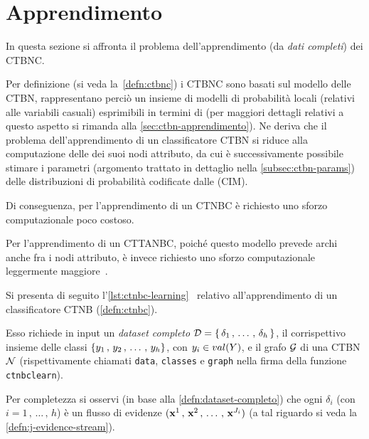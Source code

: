 \section{Apprendimento}\label{sec:learning-ctbnc}
In questa sezione si affronta il problema dell'apprendimento (da \emph{dati completi}) dei \acs{CTBNC}.

Per definizione (si veda la~\vref{defn:ctbnc}) i \acs{CTBNC} sono basati sul modello delle \acs{CTBN}, rappresentano perciò un insieme di modelli di probabilità locali (relativi alle variabili casuali) esprimibili in termini di \stats{} (per maggiori dettagli relativi a questo aspetto si rimanda alla \autoref{sec:ctbn-apprendimento}). Ne deriva che il problema dell'apprendimento di un classificatore \acs{CTBN} si riduce alla computazione delle \stats{} dei suoi nodi attributo, da cui è successivamente possibile stimare i parametri (argomento trattato in dettaglio nella \autoref{subsec:ctbn-params}) delle distribuzioni di probabilità codificate dalle \cim{} (\acs{CIM}).

Di conseguenza, per l'apprendimento di un \acs{CTNBC} è richiesto uno sforzo computazionale poco costoso.

Per l'apprendimento di un \acs{CTTANBC}, poiché questo modello prevede archi anche fra i nodi attributo, è invece richiesto uno sforzo computazionale leggermente maggiore~\citep{Stella2012}.

Si presenta di seguito l'\autoref{lst:ctnbc-learning}~\citep{Stella2012} relativo all'apprendimento di un classificatore \acs{CTNB} (\autoref{defn:ctnbc}).

Esso richiede in input un \emph{dataset completo} $\mathcal{D}=\{\,\delta_1\,,\,\dotsc\,,\,\delta_h\,\}$, il corrispettivo insieme delle classi $\{\mathnormal{y}_1\,,\,\mathnormal{y}_2\,,\,\dotsc\,,\,\mathnormal{y}_h\}$, con $\mathnormal{y}_i \in val(\mathnormal{Y})$, e il grafo $\mathcal{G}$ di una \acs{CTBN} $\mathcal{N}$ (rispettivamente chiamati \lstinline[]|data|, \lstinline[]|classes| e \lstinline[]|graph| nella firma della funzione \lstinline[]|ctnbclearn|).

Per completezza si osservi (in base alla \autoref{defn:dataset-completo}) che ogni $\delta_i$ (con $i=1\,,\,\dotsc\,,\,h$) è un flusso di evidenze $(\mathbf{x}^1\,,\,\mathbf{x}^2\,,\,\dotsc\,,\,\mathbf{x}^{J_i})$ (a tal riguardo si veda la \autoref{defn:j-evidence-stream}).

